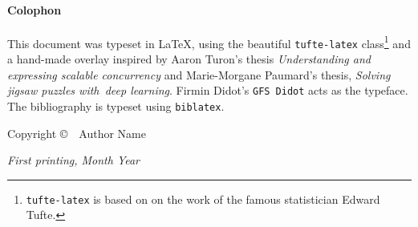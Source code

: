 \paragraph{Colophon}

This document was typeset in \LaTeX, using the beautiful \texttt{tufte-latex} class\footnote[][112ex]{\texttt{tufte-latex} is based on on the work of the famous statistician Edward Tufte.} and a hand-made overlay inspired by Aaron Turon's thesis \textit{Understanding and expressing scalable concurrency} and Marie-Morgane Paumard's thesis, \textit{Solving jigsaw puzzles with~deep learning}. Firmin Didot's \texttt{GFS Didot} acts as the typeface. The bibliography is typeset using \texttt{biblatex}.


\newthought{}Copyright \copyright\ \the\year\ Author Name

\newthought{}\textit{First printing, Month Year}
